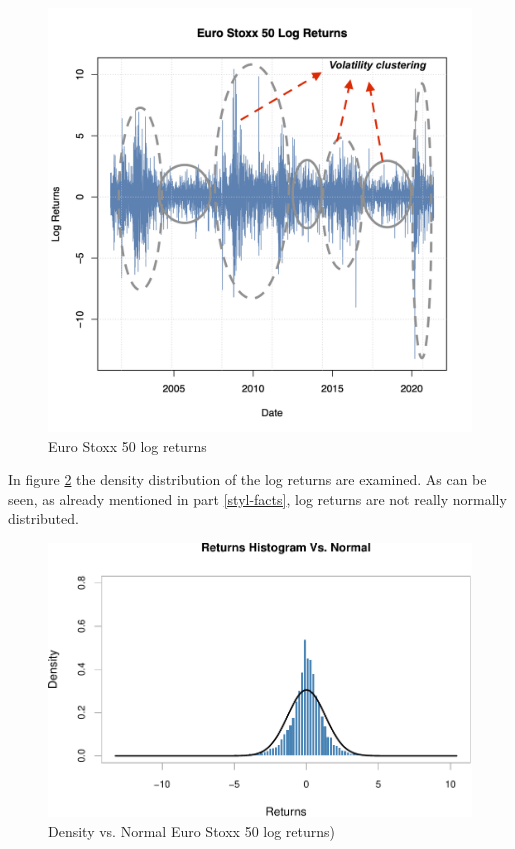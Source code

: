 \documentclass[a4paper, nobind]{templates/ociamthesis}
\begin{document}
\begin{figure}[h]

{\centering \includegraphics[width=0.7\linewidth]{figures/vol-clustering-finalized-RI} 

}

\caption{Euro Stoxx 50 log returns}\label{fig:plot2}
\end{figure}

\clearpage
\newpage

\noindent In figure \ref{fig:plot4} the density distribution of the log returns are examined. As can be seen, as already mentioned in part \ref{styl-facts}, log returns are not really normally distributed.

\begin{figure}[h]

{\centering \includegraphics[width=0.75\linewidth]{_main_files/figure-latex/plot4-1} 

}

\caption{Density vs. Normal Euro Stoxx 50 log returns)}\label{fig:plot4}
\end{figure}
\end{document}

